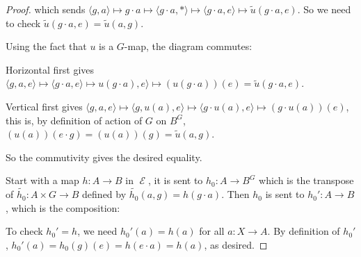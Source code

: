 \documentclass[a4paper]{article}
\DeclareMathOperator{\E}{\mathcal E}
\DeclareMathOperator{\ev}{\text {ev}}
\begin{document}
\begin{proof}
    which sends $\langle g,a\rangle\mapsto g\cdot a \mapsto \langle g\cdot a,*\rangle \mapsto \langle g\cdot a,e\rangle \mapsto \tilde{u}(g\cdot a,e)$. So we need to check $\tilde{u}(g\cdot a,e)=\tilde{u}(a,g)$.

    Using the fact that $u$ is a $G$-map, the diagram commutes:

    \begin{center}
    \end{center}

    Horizontal first gives $\langle g,a,e\rangle\mapsto \langle g\cdot a,e\rangle\mapsto u(g\cdot a),e\rangle \mapsto (u(g\cdot a))(e)=\tilde{u}(g\cdot a,e)$.

    Vertical first gives $\langle g,a,e\rangle\mapsto \langle g,u(a),e\rangle\mapsto \langle g\cdot u(a),e\rangle \mapsto (g\cdot u(a))(e)$, this is, by definition of action of $G$ on $B^G$, $(u(a))(e\cdot g)=(u(a))(g)=\tilde{u}(a,g)$.

    So the commutivity gives the desired equality.

     
    Start with a map $h:A\to B$ in $\E$, it is sent to $h_0:A\to B^G$ which is the transpose of $\tilde{h_0}:A\times G\to B$ defined by $\tilde{h_0}(a,g)=h(g\cdot a)$. Then $h_0$ is sent to $h_0':A\to B$, which is the composition:
    \begin{center}
    \end{center}

    To check $h_0'=h$, we need $h_0'(a)=h(a)$ for all $a:X\to A$. By definition of $h_0'$, $h_0'(a)=h_0(g)(e)=h(e\cdot a)=h(a)$, as desired.

    

    







    



    
\end{proof}
\end{document}
